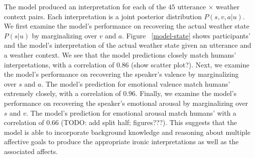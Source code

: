 \documentclass[10pt,letterpaper]{article}
\begin{document}
The model produced an interpretation for each of the $45$ utterance $\times$ weather context pairs. Each interpretation is a joint posterior distribution $P(s, v, a | u)$. We first examine the model's performance on recovering the actual weather state $P(s | u)$ by marginalizing over $v$ and $a$. Figure ~\ref{model-state} shows participants' and the model's interpretation of the actual weather state given an utterance and a weather context. We see that the model predictions closely match humans' interpretations, with a correlation of $0.86$ (show scatter plot?). 
Next, we examine the model's performance on recovering the speaker's valence by marginalizing over $s$ and $a$. The model's prediction for emotional valence match humans' extremely closely, with a correlation of $0.96$.
Finally, we examine the model's performance on recovering the speaker's emotional arousal by marginalizing over $s$ and $v$. The model's prediction for emotional arousal match humans' with a correlation of $0.66$ (TODO: add split half; figures???). 
This suggests that the model is able to incorporate background knowledge and reasoning about multiple affective goals to produce the appropriate ironic interpretations as well as the associated affects. 
\end{document}

